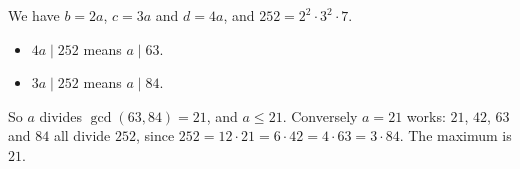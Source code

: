 We have $b=2a$, $c=3a$ and $d=4a$, and $252=2^2\cdot3^2\cdot7$.
\begin{itemize}
\item $4a\mid252$ means $a\mid63$.
\item $3a\mid252$ means $a\mid84$.
\end{itemize}
So $a$ divides $\gcd(63,84)=21$, and $a\le21$. Conversely $a=21$ works: $21$, $42$, $63$ and $84$ all divide $252$, since $252=12\cdot21=6\cdot42=4\cdot63=3\cdot84$. The maximum is $\boxed{21}$.
